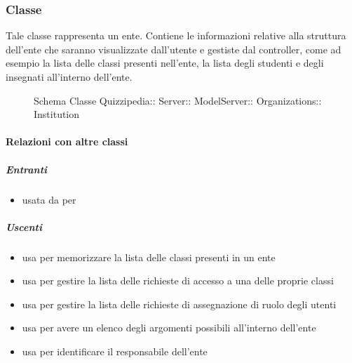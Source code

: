\subsubsection{Classe }
Tale classe rappresenta un ente. Contiene le informazioni relative alla struttura dell'ente che saranno visualizzate dall'utente e gestiste dal controller, come ad esempio la lista delle classi presenti nell'ente, la lista degli studenti e degli insegnati all'interno dell'ente.
\begin{figure}[H]
\centering
\noindent{}
\caption[Schema Classe Institution]{Schema Classe Quizzipedia:: Server:: ModelServer:: Organizations:: Institution}
\end{figure}
\paragraph{Relazioni con altre classi}
\subparagraph{Entranti}
\begin{itemize}
\item usata da  per 
\end{itemize}
\subparagraph{Uscenti}
\begin{itemize}
\item usa  per memorizzare la lista
delle classi presenti in un ente
\item usa  per gestire la lista delle richieste di accesso a una delle proprie classi
\item usa  per gestire la lista delle richieste di assegnazione di ruolo degli utenti
\item usa  per avere un elenco degli argomenti possibili all'interno dell'ente
\item usa  per identificare il responsabile dell'ente
\end{itemize}
